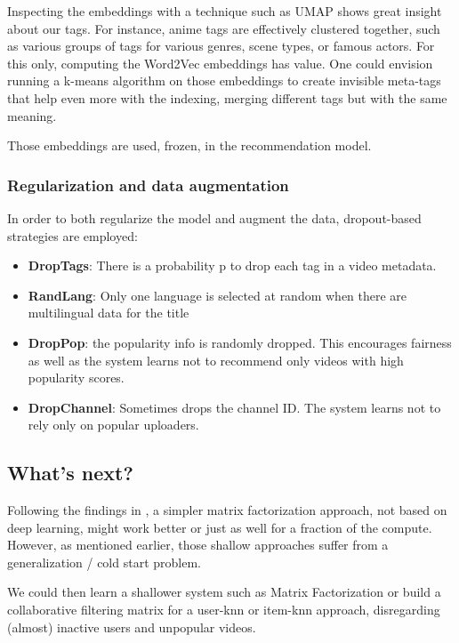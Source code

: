 Inspecting the embeddings with a technique such as UMAP \citep{umap} shows great insight about our tags. For instance, anime tags are effectively clustered together, such as various groups of tags for various genres, scene types, or famous actors. For this only, computing the Word2Vec embeddings has value. One could envision running a k-means algorithm on those embeddings to create invisible meta-tags that help even more with the indexing, merging different tags but with the same meaning.

Those embeddings are used, frozen, in the recommendation model.

\subsubsection{Regularization and data augmentation}

In order to both regularize the model and augment the data, dropout-based strategies are employed:

\begin{itemize}
    \item \textbf{DropTags}: There is a probability p to drop each tag in a video metadata.
    \item \textbf{RandLang}: Only one language is selected at random when there are multilingual data for the title
    \item \textbf{DropPop}: the popularity info is randomly dropped. This encourages fairness as well as the system learns not to recommend only videos with high popularity scores.
    \item \textbf{DropChannel}: Sometimes drops the channel ID. The system learns not to rely only on popular uploaders.
\end{itemize}


\subsection{What's next?}

Following the findings in \citet{dlinrec}, a simpler matrix factorization approach, not based on deep learning, might work better or just as well for a fraction of the compute. However, as mentioned earlier, those shallow approaches suffer from a generalization / cold start problem.

We could then learn a shallower system such as Matrix Factorization or build a collaborative filtering matrix for a user-knn or item-knn approach, disregarding (almost) inactive users and unpopular videos. 

